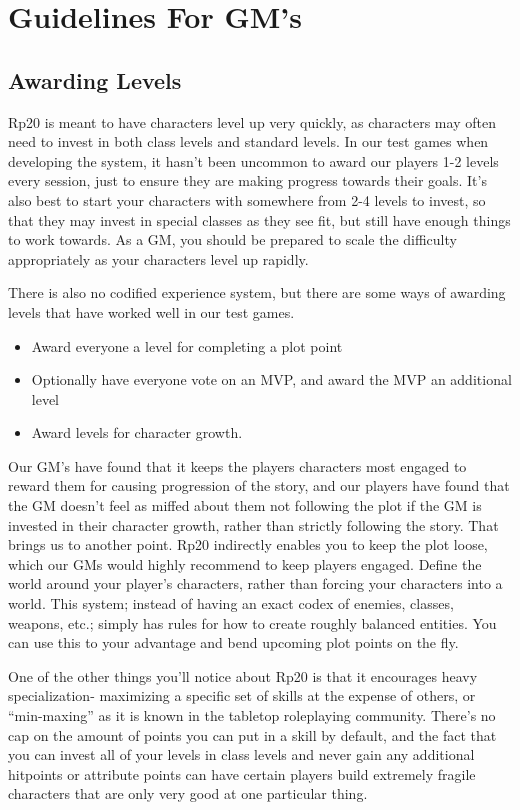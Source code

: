 \chapter{Guidelines For GM's}
\section{Awarding Levels}
Rp20 is meant to have characters level up very quickly, as characters may often need to invest in both class levels and standard levels. In our test games when developing the system, it hasn’t been uncommon to award our players 1-2 levels every session, just to ensure they are making progress towards their goals. It’s also best to start your characters with somewhere from 2-4 levels to invest, so that they may invest in special classes as they see fit, but still have enough things to work towards.
As a GM, you should be prepared to scale the difficulty appropriately as your characters level up rapidly.

There is also no codified experience system, but there are some ways of awarding levels that have worked well in our test games.
\begin{itemize}
\item Award everyone a level for completing a plot point
\item Optionally have everyone vote on an MVP, and award the MVP an additional level
\item Award levels for character growth.
\end{itemize}
Our GM’s have found that it keeps the players characters most engaged to reward them for causing progression of the story, and our players have found that the GM doesn’t feel as miffed about them not following the plot if the GM is invested in their character growth, rather than strictly following the story.
That brings us to another point. Rp20 indirectly enables you to keep the plot loose, which our GMs would highly recommend to keep players engaged. Define the world around your player’s characters, rather than forcing your characters into a world. This system; instead of having an exact codex of enemies, classes, weapons, etc.; simply has rules for how to create roughly balanced entities. You can use this to your advantage and bend upcoming plot points on the fly.

One of the other things you’ll notice about Rp20 is that it encourages heavy specialization- maximizing a specific set of skills at the expense of others, or “min-maxing” as it is known in the tabletop roleplaying community. There’s no cap on the amount of points you can put in a skill by default, and the fact that you can invest all of your levels in class levels and never gain any additional hitpoints or attribute points can have certain players build extremely fragile characters that are only very good at one particular thing.

